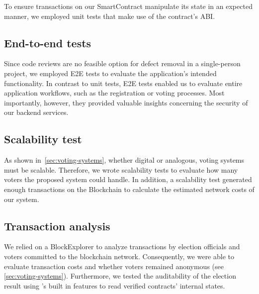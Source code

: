 To ensure transactions on our \gls{SmartContract} manipulate its state in an expected manner, we employed unit tests that make use of the contract's \gls{ABI}.

\subsection{End-to-end tests}\label{subsec:end-to-end-tests}

Since code reviews are no feasible option for defect removal in a single-person project, we employed \gls{E2E} tests to evaluate the application’s intended functionality.
In contrast to unit tests, \gls{E2E} tests enabled us to evaluate entire application workflows, such as the registration or voting processes.
Most importantly, however, they provided valuable insights concerning the security of our backend services.

\subsection{Scalability test}\label{subsec:scalability-test}

As shown in~\cref{sec:voting-systems}, whether digital or analogous, voting systems must be scalable.
Therefore, we wrote scalability tests to evaluate how many voters the proposed system could handle.
In addition, a scalability test generated enough transactions on the \gls{Blockchain} to calculate the estimated network costs of our system.

\subsection{Transaction analysis}\label{subsec:transaction-analysis}

We relied on a \gls{BlockExplorer} to analyze transactions by election officials and voters committed to the blockchain network.
Consequently, we were able to evaluate transaction costs and whether voters remained anonymous (see \cref{sec:voting-systems}).
Furthermore, we tested the auditability of the election result using 's built in features to read verified contracts' internal states.